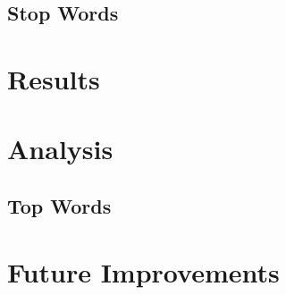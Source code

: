 \documentclass{article}
\begin{document}
\subsection{Stop Words}



\section{Results}

\section{Analysis}
\subsection{Top Words}


\section{Future Improvements}





\end{document}
